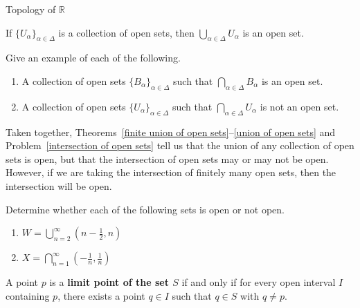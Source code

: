 \begin{section}{Topology of $\mathbb{R}$}
\begin{theorem}\label{union of open sets}
If $\{U_{\alpha}\}_{\alpha\in\Delta}$ is a collection of open sets, then $\bigcup_{\alpha\in\Delta} U_{\alpha}$ is an open set.
\end{theorem}

\begin{problem}\label{intersection of open sets}
Give an example of each of the following.
\begin{enumerate}[label=\textrm{(\alph*)}]
\item A collection of open sets $\{B_{\alpha}\}_{\alpha\in\Delta}$ such that $\bigcap_{\alpha\in\Delta} B_{\alpha}$ is an open set.
\item A collection of open sets $\{U_{\alpha}\}_{\alpha\in\Delta}$ such that $\bigcap_{\alpha\in\Delta} U_{\alpha}$ is not an open set.
\end{enumerate}
\end{problem}

\begin{remark}\label{rem:union vs intersection of open sets}
Taken together, Theorems~\ref{finite union of open sets}--\ref{union of open sets} and Problem~\ref{intersection of open sets} tell us that the union of any collection of open sets is open, but that the intersection of open sets may or may not be open.  However, if we are taking the intersection of finitely many open sets, then the intersection will be open.
\end{remark}

\begin{problem}
Determine whether each of the following sets is open or not open.
\begin{multicols}{2}
\begin{enumerate}[label=\textrm{(\alph*)}]
\item $\displaystyle W=\bigcup_{n=2}^{\infty} \left(n - \frac{1}{2},n\right)$
\item $\displaystyle X=\bigcap_{n=1}^{\infty} \left(-\frac{1}{n}, \frac{1}{n}\right)$
\end{enumerate}
\end{multicols}
\end{problem}

\begin{definition}
A point $p$ is a \textbf{limit point of the set $S$} if and only if for every open interval $I$ containing $p$, there exists a point $q \in I$ such that $q \in S$ with $q\neq p$.
\end{definition}


\end{section}

